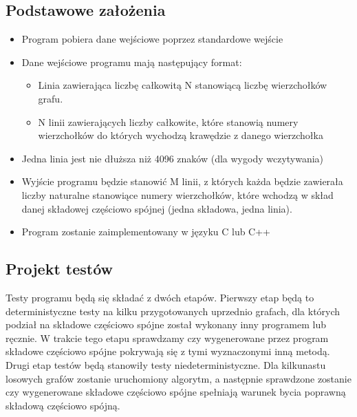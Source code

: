 \documentclass[a4paper,10pt]{article}
\begin{document}
\subsection{Podstawowe założenia}
\begin{itemize}
\item Program pobiera dane wejściowe poprzez standardowe wejście
\item Dane wejściowe programu mają następujący format:
  \begin{itemize}
  \item Linia zawierająca liczbę całkowitą N stanowiącą liczbę wierzchołków grafu.
  \item N linii zawierających liczby całkowite, które stanowią numery
    wierzchołków do których wychodzą krawędzie z danego wierzchołka
  \end{itemize}
\item Jedna linia jest nie dłuższa niż 4096 znaków (dla wygody wczytywania)
\item Wyjście programu będzie stanowić M linii, z których każda będzie
  zawierała liczby naturalne stanowiące numery wierzchołków, które
  wchodzą w skład danej składowej częściowo spójnej (jedna składowa,
  jedna linia).
\item Program zostanie zaimplementowany w języku C lub C++
\end{itemize}

\subsection{Projekt testów}

Testy programu będą się składać z dwóch etapów. Pierwszy etap będą to
deterministyczne testy na kilku przygotowanych uprzednio grafach, dla
których podział na składowe częściowo spójne został wykonany inny
programem lub ręcznie. W trakcie tego etapu sprawdzamy czy
wygenerowane przez program składowe częściowo spójne pokrywają się z
tymi wyznaczonymi inną metodą. Drugi etap testów będą stanowiły testy
niedeterministyczne. Dla kilkunastu losowych grafów zostanie
uruchomiony algorytm, a następnie sprawdzone zostanie czy wygenerowane
składowe częściowo spójne spełniają warunek bycia poprawną składową
częściowo spójną.
\end{document}
